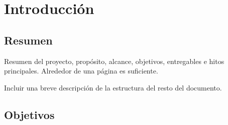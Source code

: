 
\chapter{Introducci\'on} %

\label{Chapter1} %


\section{Resumen}

Resumen del proyecto, propósito, alcance, objetivos, entregables e hitos principales. Alrededor de una página es suficiente.

Incluir una breve descripción de la estructura del resto del documento.

\section{Objetivos}